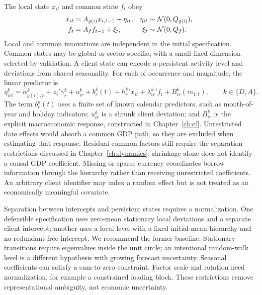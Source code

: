 The local state $x_{it}$ and common state $f_t$ obey
\begin{align}
x_{it}&=A_{g(i)}x_{i,t-1}+\eta_{it},&\eta_{it}&\sim\mathcal N(0,Q_{g(i)}),\\
f_t&=A_f f_{t-1}+\xi_t,&\xi_t&\sim\mathcal N(0,Q_f).
\end{align}
Local and common innovations are independent in the initial specification. Common states may be global or sector-specific, with a small fixed dimension selected by validation. A client state can encode a persistent activity level and deviations from shared seasonality. For each of occurrence and magnitude, the linear predictor is
\begin{equation}
\eta^k_{irt}=\alpha^k_{g(i),r}+z_i'\gamma^k_r+u^k_{ir}
+b^k_{r}(t)+{h^k_r}'x_{it}+{\lambda^k_{ir}}'f_t
+B^k_{ir}(m_{1:t}),\qquad k\in\{D,A\}.
\label{eq:predictor}
\end{equation}
The term $b_r^k(t)$ uses a finite set of known calendar predictors, such as month-of-year and holiday indicators; $u^k_{ir}$ is a shrunk client deviation; and $B^k_{ir}$ is the explicit macroeconomic response, constructed in Chapter~\ref{ch:cf}. Unrestricted date effects would absorb a common GDP path, so they are excluded when estimating that response. Residual common factors still require the separation restrictions discussed in Chapter~\ref{ch:dynamics}; shrinkage alone does not identify a causal GDP coefficient. Missing or sparse currency coordinates borrow information through the hierarchy rather than receiving unrestricted coefficients. An arbitrary client identifier may index a random effect but is not treated as an economically meaningful covariate.

Separation between intercepts and persistent states requires a normalization. One defensible specification uses zero-mean stationary local deviations and a separate client intercept; another uses a local level with a fixed initial-mean hierarchy and no redundant free intercept. We recommend the former baseline. Stationary transitions require eigenvalues inside the unit circle; an intentional random-walk level is a different hypothesis with growing forecast uncertainty. Seasonal coefficients can satisfy a sum-to-zero constraint. Factor scale and rotation need normalization, for example a constrained loading block. These restrictions remove representational ambiguity, not economic uncertainty.

